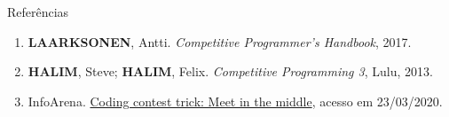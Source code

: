\begin{frame}[fragile]{Referências}

    \begin{enumerate}
        \item \textbf{LAARKSONEN}, Antti. \textit{Competitive Programmer's Handbook}, 2017.

        \item \textbf{HALIM}, Steve; \textbf{HALIM}, Felix. \textit{Competitive Programming 3}, Lulu, 2013.

        \item InfoArena. \href{https://www.infoarena.ro/blog/meet-in-the-middle}{Coding contest trick: Meet in the middle}, acesso em 23/03/2020.
 
    \end{enumerate}

\end{frame}

